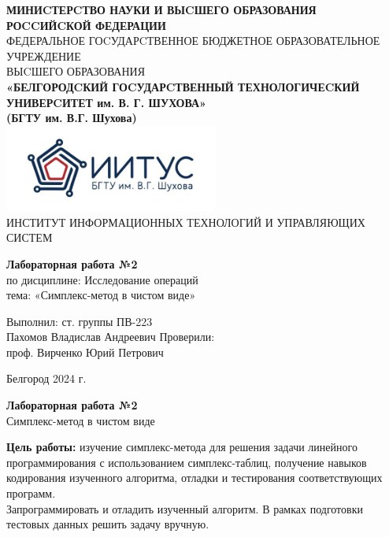 \documentclass[a4paper,14pt]{extarticle}
\newcommand\textbox[1]{
	\parbox{.45\textwidth}{#1}
}
\begin{document}
\begin{center}
    \small{
        \textbf{МИНИCТЕРCТВО НАУКИ И ВЫCШЕГО ОБРАЗОВАНИЯ РОCCИЙCКОЙ ФЕДЕРАЦИИ}\\
        ФЕДЕРАЛЬНОЕ ГОCУДАРCТВЕННОЕ БЮДЖЕТНОЕ ОБРАЗОВАТЕЛЬНОЕ УЧРЕЖДЕНИЕ\\ВЫCШЕГО ОБРАЗОВАНИЯ \\
        \textbf{«БЕЛГОРОДCКИЙ ГОCУДАРCТВЕННЫЙ ТЕХНОЛОГИЧЕCКИЙ\\УНИВЕРCИТЕТ им. В. Г. ШУХОВА»\\ (БГТУ им. В.Г. Шухова)} \\
        \bigbreak
        \includegraphics[width=70mm]{log}\\
        ИНСТИТУТ ИНФОРМАЦИОННЫХ ТЕХНОЛОГИЙ И УПРАВЛЯЮЩИХ СИСТЕМ\\}
\end{center}

\vfill
\begin{center}
    \large{
        \textbf{
            Лабораторная работа №2}}\\
    \normalsize{
        по дисциплине: Исследование операций \\
        тема: «Симплекс-метод в чистом виде»}
\end{center}
\vfill
\hfill\textbox{
    Выполнил: ст. группы ПВ-223\\Пахомов Владислав Андреевич
    \bigbreak
    Проверили: \\проф. Вирченко Юрий Петрович
}
\vfill\begin{center}
    Белгород 2024 г.
\end{center}
\newpage
\begin{center}
    \textbf{Лабораторная работа №2}\\
    Симплекс-метод в чистом виде\\
\end{center}
\textbf{Цель работы: }изучение симплекс-метода для решения задачи
линейного программирования с использованием симплекс-таблиц,
получение навыков кодирования изученного алгоритма, отладки и
тестирования соответствующих программ.\\

Запрограммировать и отладить изученный алгоритм. В рамках
подготовки тестовых данных решить задачу вручную.
\end{document}
